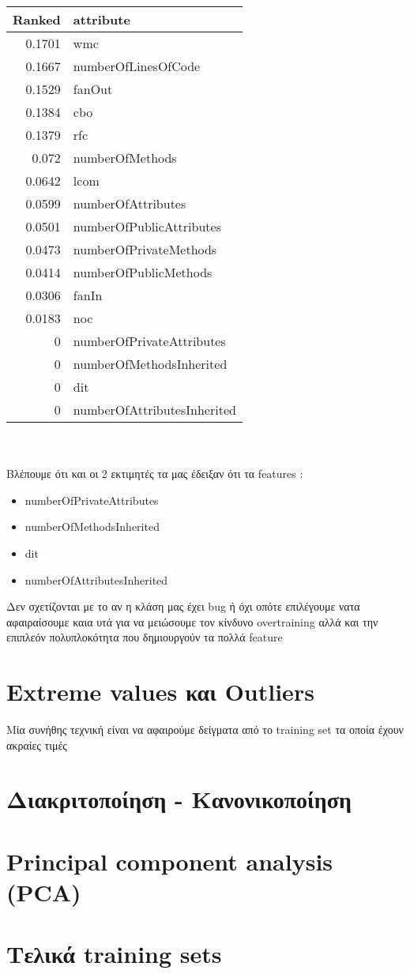 \begin{tabular}{r|l}
 Ranked & attribute\\
\hline
 0.1701 &  wmc\\
 0.1667&   numberOfLinesOfCode\\
 0.1529&   fanOut\\
 0.1384&   cbo\\
 0.1379&   rfc\\
 0.072 &  numberOfMethods\\
 0.0642&   lcom\\
 0.0599&   numberOfAttributes\\
 0.0501&   numberOfPublicAttributes\\
 0.0473&  numberOfPrivateMethods\\
 0.0414&   numberOfPublicMethods\\
 0.0306&   fanIn\\
 0.0183&   noc\\
 0      &  numberOfPrivateAttributes\\
 0      &  numberOfMethodsInherited\\
 0      &  dit\\
 0      &  numberOfAttributesInherited\\
 \end{tabular}\newline \\ \\ 
Βλέπουμε ότι και οι 2 εκτιμητές τα μας έδειξαν ότι       τα features :
\begin{itemize}
\bfseries
\item numberOfPrivateAttributes
\item numberOfMethodsInherited
\item dit
\item numberOfAttributesInherited 
\end{itemize}
 Δεν σχετίζονται με το αν η κλάση μας έχει bug ή όχι οπότε επιλέγουμε νατα αφαιραίσουμε καια υτά 
 για να μειώσουμε τον κίνδυνο overtraining αλλά και την επιπλεόν πολυπλοκότητα που δημιουργούν τα πολλά feature
 \section { Extreme values και Outliers }
 Μία συνήθης τεχνική είναι να αφαιρούμε δείγματα από το training set τα οποία  έχουν ακραίες τιμές  
 \section { Διακριτοποίηση - Κανονικοποίηση  }
 \section { Principal component analysis (PCA)}
 \section{Τελικά training sets}
